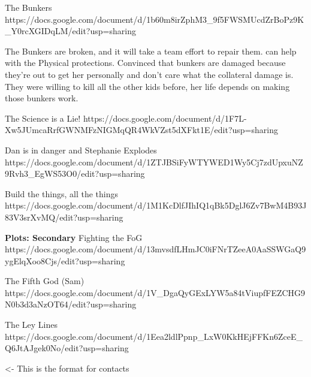 \documentclass[char]{GL2020}
\begin{document}
The Bunkers
https://docs.google.com/document/d/1b60m8irZphM3_9f5FWSMUcdZrBoPz9K_Y0rcXGIDqLM/edit?usp=sharing

The Bunkers are broken, and it will take a team effort to repair them.  \cAssistantScientist{} can help with the Physical protections.  Convinced that bunkers are damaged because they’re out to get her personally and don’t care what the collateral damage is.  They were willing to kill all the other kids before, her life depends on making those bunkers work.

The Science is a Lie!
https://docs.google.com/document/d/1F7L-Xw5JUmcaRrfGWNMFzNIGMqQR4WkVZst5dXFkt1E/edit?usp=sharing

Dan is in danger and Stephanie Explodes
https://docs.google.com/document/d/1ZTJBSiFyWTYWED1Wy5Cj7zdUpxuNZ9Rvh3_EgWS53O0/edit?usp=sharing

Build the things, all the things
https://docs.google.com/document/d/1M1KcDlfJIhIQ1qBk5DglJ6Zv7BwM4B93J83V3srXvMQ/edit?usp=sharing

\textbf{Plots: Secondary}
Fighting the FoG
https://docs.google.com/document/d/13mvsdfLHmJC0iFNrTZeeA0AaSSWGaQ9ygElqXoo8Cjs/edit?usp=sharing

The Fifth God (Sam)
https://docs.google.com/document/d/1V_DgaQyGExLYW5a84tViupfFEZCHG9N0b3d3aNzOT64/edit?usp=sharing

The Ley Lines
https://docs.google.com/document/d/1Eea2ldlPpnp_LxW0KkHEjFFKn6ZceE_Q6JtAJgek0No/edit?usp=sharing


\begin{itemz}[Goals]
	\item 
\end{itemz}

\begin{itemz}[Notes]
	\item 
\end{itemz}

\begin{contacts}
	\contact{\cTest{}} <- This is the format for contacts 
\end{contacts}
\end{document}

